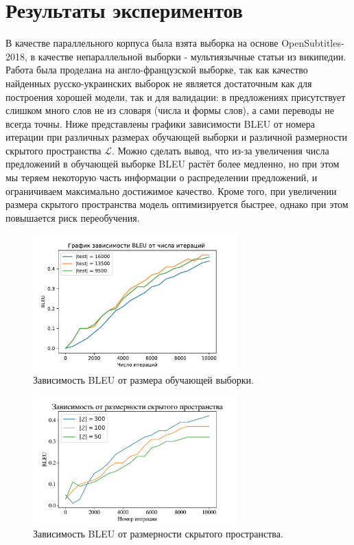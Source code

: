 \documentclass[12pt,twoside]{article}
\begin{document}
\section{Результаты экспериментов}

В качестве параллельного корпуса была взята выборка на основе OpenSubtitles-2018, в качестве непараллельной выборки - мультиязычные статьи из википедии. Работа была проделана на англо-французской выборке, так как качество найденных русско-украинских выборок не является достаточным как для построения хорошей модели, так и для валидации: в предложениях присутствует слишком много слов не из словаря (числа и формы слов), а сами переводы не всегда точны. Ниже представлены графики зависимости BLEU от номера итерации при различных размерах обучающей выборки и различной размерности скрытого пространства $\mathcal{L}$. Можно сделать вывод, что из-за увеличения числа предложений в обучающей выборке BLEU растёт более медленно, но при этом мы теряем некоторую часть информации о распределении предложений, и ограничиваем максимально достижимое качество. Кроме того, при увеличении размера скрытого пространства модель оптимизируется быстрее, однако при этом повышается риск переобучения.

\begin{figure}[h]
	\centering
	\includegraphics[width=0.7\textwidth]{volume}
	\caption{Зависимость BLEU от размера обучающей выборки.}
\end{figure}

\begin{figure}[h]
	\centering
	\includegraphics[width=0.7\textwidth]{hidden}
	\caption{Зависимость BLEU от размерности скрытого пространства.}
\end{figure}
\end{document}
